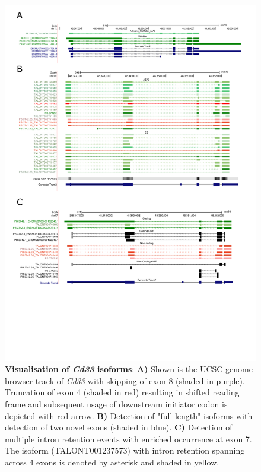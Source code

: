\begin{landscape}
	\begin{figure}[htp]
		\begin{center}
			\includegraphics[page=10,trim={0 4cm 0 0},scale = 0.85]{Figures/pdfjoiner.pdf}
		\end{center}
		\captionsetup{width=1.5\textwidth}
		\caption[Visualisation of \textit{Cd33} isoforms]%
		{\textbf{Visualisation of \textit{Cd33} isoforms}: \textbf{A)} Shown is the UCSC genome browser track of \textit{Cd33} with skipping of exon 8 (shaded in purple). Truncation of exon 4 (shaded in red) resulting in shifted reading frame and subsequent usage of downstream initiator codon is depicted with red arrow. \textbf{B)} Detection of "full-length" isoforms with detection of two novel exons (shaded in blue). \textbf{C)} Detection of multiple intron retention events with enriched occurrence at exon 7. The isoform (TALONT001237573) with intron retention spanning across 4 exons is denoted by asterisk and shaded in yellow.}   
		\label{fig:cd33_track2}
	\end{figure}
\end{landscape}


